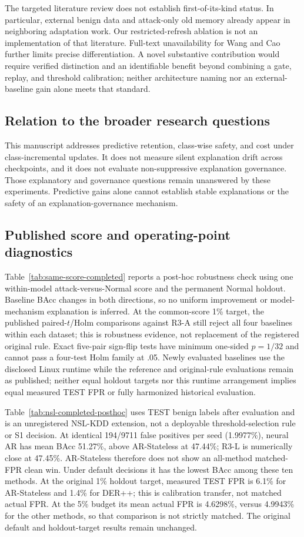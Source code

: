 \documentclass[10pt,twocolumn]{article}
\begin{document}
The targeted literature review does not establish first-of-its-kind status. In particular, external benign data and attack-only old memory already appear in neighboring adaptation work. Our restricted-refresh ablation is not an implementation of that literature. Full-text unavailability for Wang and Cao further limits precise differentiation. A novel substantive contribution would require verified distinction and an identifiable benefit beyond combining a gate, replay, and threshold calibration; neither architecture naming nor an external-baseline gain alone meets that standard.

\subsection{Relation to the broader research questions}
This manuscript addresses predictive retention, class-wise safety, and cost under class-incremental updates. It does not measure silent explanation drift across checkpoints, and it does not evaluate non-suppressive explanation governance. Those explanatory and governance questions remain unanswered by these experiments. Predictive gains alone cannot establish stable explanations or the safety of an explanation-governance mechanism.

\subsection{Published score and operating-point diagnostics}
Table~\ref{tab:same-score-completed} reports a post-hoc robustness check using one within-model attack-versus-Normal score and the permanent Normal holdout. Baseline BAcc changes in both directions, so no uniform improvement or model-mechanism explanation is inferred. At the common-score 1\% target, the published paired-$t$/Holm comparisons against R3-A still reject all four baselines within each dataset; this is robustness evidence, not replacement of the registered original rule. Exact five-pair sign-flip tests have minimum one-sided $p=1/32$ and cannot pass a four-test Holm family at .05. Newly evaluated baselines use the disclosed Linux runtime while the reference and original-rule evaluations remain as published; neither equal holdout targets nor this runtime arrangement implies equal measured TEST FPR or fully harmonized historical evaluation.

Table~\ref{tab:nsl-completed-posthoc} uses TEST benign labels after evaluation and is an unregistered NSL-KDD extension, not a deployable threshold-selection rule or S1 decision. At identical 194/9711 false positives per seed (1.9977\%), neural AR has mean BAcc 51.27\%, above AR-Stateless at 47.44\%; R3-L is numerically close at 47.45\%. AR-Stateless therefore does not show an all-method matched-FPR clean win. Under default decisions it has the lowest BAcc among these ten methods. At the original 1\% holdout target, measured TEST FPR is 6.1\% for AR-Stateless and 1.4\% for DER++; this is calibration transfer, not matched actual FPR. At the 5\% budget its mean actual FPR is 4.6298\%, versus 4.9943\% for the other methods, so that comparison is not strictly matched. The original default and holdout-target results remain unchanged.
\end{document}
